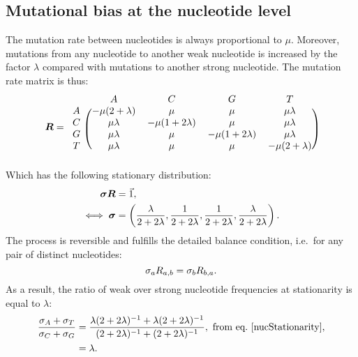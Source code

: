 \subsection{Mutational bias at the nucleotide level}
\label{sec:mut-bias-mut-matrix}
The mutation rate between nucleotides is always proportional to $\mu$.
Moreover, mutations from any nucleotide to another weak nucleotide is increased by the factor $\lambda$ compared with mutations to another strong nucleotide.
The mutation rate matrix is thus:
\begin{equation}
    \label{nucMatrix}
    \Mutmatrix =
    \begin{blockarray}{ccccc}
        & A & C & G & T \\
        \begin{block}{c(cccc)}
            A & {-\mu(2 + \lambda)} & {\mu} & {\mu} & {\mu \lambda} \\
            C & {\mu \lambda} & {-\mu(1 + 2\lambda)} & {\mu} & {\mu \lambda} \\
            G & {\mu \lambda} & {\mu} & {-\mu(1 + 2\lambda)} & {\mu \lambda} \\
            T & {\mu \lambda} & {\mu} & {\mu} & {-\mu(2 + \lambda)} \\
        \end{block}
    \end{blockarray}
\end{equation}
Which has the following stationary distribution:
\begin{align}
    \bm{\sigma} \bm{R} & = \vec{1}, \\
    \iff \bm{\sigma} & = \left( \dfrac{\lambda}{2+2\lambda}, \dfrac{1}{2+2\lambda}, \dfrac{1}{2+2\lambda}, \dfrac{\lambda}{2+2\lambda} \right).
    \label{nucStationarity}
\end{align}
The process is reversible and fulfills the detailed balance condition, i.e.~for any pair of distinct nucleotides:
\begin{equation}
    \sigma_a R_{a, b} =\sigma_b R_{b, a}.
    \label{nucMutBalance}
\end{equation}
As a result, the ratio of weak over strong nucleotide frequencies at stationarity is equal to $\lambda$:
\begin{align}
    \label{lambda}
    \dfrac{ \mutequi_A + \mutequi_T }{ \mutequi_C + \mutequi_G }
    & = \dfrac{ \lambda ( 2 + 2 \lambda)^{-1} + \lambda ( 2 + 2 \lambda)^{-1}}{ ( 2 + 2 \lambda)^{-1} + ( 2 + 2 \lambda)^{-1}}, \ \text{from eq.~\ref{nucStationarity},}\\
    & = \lambda.
\end{align}

